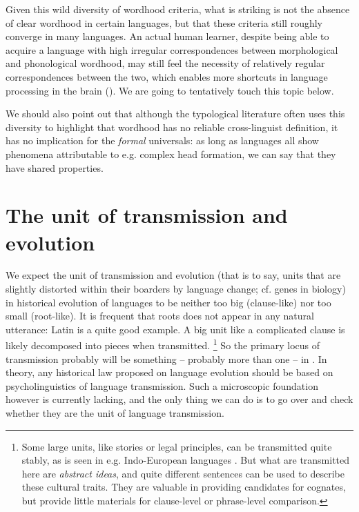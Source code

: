 \documentclass[a4paper, oneside, scheme=plain, 12pt]{article}
\newcommand*{\citechap}[1]{Ch.~{#1}}
\begin{document}
Given this wild diversity of wordhood criteria,
what is striking is not the absence of clear wordhood in certain languages,
but that these criteria still roughly converge in many languages.
An actual human learner, despite being able to acquire a language with high irregular correspondences between morphological and phonological wordhood,
may still feel the necessity of relatively regular correspondences between the two,
which enables more shortcuts in language processing in the brain ().
We are going to tentatively touch this topic below.

We should also point out that although the typological literature often uses this diversity to highlight that wordhood has no reliable cross-linguist definition,
it has no implication for the \emph{formal} universals: as long as languages all show phenomena attributable to e.g. complex head formation, we can say that they have shared properties. 

\section{The unit of transmission and evolution}\label{sec:unit-of-transmission}

We expect the unit of transmission and evolution
(that is to say, units that are slightly distorted within their boarders by language change;
cf. genes in biology)
in historical evolution of languages
to be neither too big (clause-like) nor too small (root-like).
It is frequent that roots does not appear in any natural utterance:
Latin is a quite good example.
A big unit like a complicated clause is likely decomposed into pieces when transmitted.%
\footnote{
    Some large units, like stories or legal principles, can be transmitted quite stably,
    as is seen in e.g. Indo-European languages \citep[\citechap{2}]{fortson2011indo}.
    But what are transmitted here are \emph{abstract ideas},
    and quite different sentences can be used to describe these cultural traits.
    They are valuable in providing candidates for cognates,
    but provide little materials for clause-level or phrase-level comparison.
}
So the primary locus of transmission probably will be something -- probably more than one -- in .
In theory, any historical law proposed on language evolution 
should be based on psycholinguistics of language transmission.
Such a microscopic foundation however is currently lacking,
and the only thing we can do is to go over 
and check whether they are the unit of language transmission.
\end{document}
